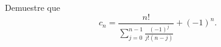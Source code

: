 Demuestre que
\[ c_n = \frac{n!}{\displaystyle\sum_{j=0}^{n-1} \tfrac{(-1)^j}{j!(n-j)}} + (-1)^n. \]

